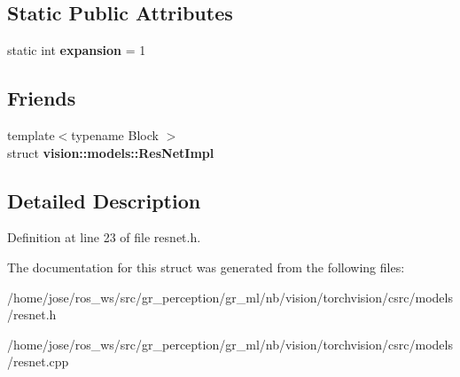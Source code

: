 \subsection*{Static Public Attributes}
\begin{DoxyCompactItemize}
\item 
\mbox{\label{structvision_1_1models_1_1__resnetimpl_1_1BasicBlock_a56b91d31ad5dc2923186f9fc01aa16b7}} 
static int {\bfseries expansion} = 1
\end{DoxyCompactItemize}
\subsection*{Friends}
\begin{DoxyCompactItemize}
\item 
\mbox{\label{structvision_1_1models_1_1__resnetimpl_1_1BasicBlock_a2d4c95d61d2126a085e162451df61b9d}} 
{\footnotesize template$<$typename Block $>$ }\\struct {\bfseries vision\+::models\+::\+Res\+Net\+Impl}
\end{DoxyCompactItemize}


\subsection{Detailed Description}


Definition at line 23 of file resnet.\+h.



The documentation for this struct was generated from the following files\+:\begin{DoxyCompactItemize}
\item 
/home/jose/ros\+\_\+ws/src/gr\+\_\+perception/gr\+\_\+ml/nb/vision/torchvision/csrc/models/resnet.\+h\item 
/home/jose/ros\+\_\+ws/src/gr\+\_\+perception/gr\+\_\+ml/nb/vision/torchvision/csrc/models/resnet.\+cpp\end{DoxyCompactItemize}
